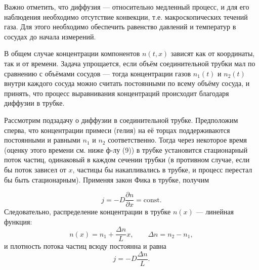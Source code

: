 \documentclass[a4paper]{article}
\begin{document}
	Важно отметить, что диффузия — относительно медленный процесс, и для его наблюдения необходимо отсутствие конвекции, т.е. макроскопических течений газа. Для этого необходимо обеспечить равенство давлений и температур в сосудах до начала измерений.
	
	В общем случае концентрации компонентов $n(t,x)$ зависят как от координаты, так и от времени. Задача упрощается, если объём соединительной трубки мал по сравнению с объёмами сосудов — тогда концентрации газов $n_1(t)$ и $n_2(t)$ внутри каждого сосуда можно считать постоянными по всему объёму сосуда, и принять, что процесс выравнивания концентраций происходит благодаря диффузии в трубке.
	
	Рассмотрим подзадачу о диффузии в соединительной трубке. Предположим сперва, что концентрации примеси (гелия) на её торцах поддерживаются постоянными и равными $n_1$ и $n_2$ соответственно. Тогда через некоторое время (оценку этого времени см. ниже ф-лу (9)) в трубке установится стационарный поток частиц, одинаковый в каждом сечении трубки (в противном случае, если бы поток зависел от $x$, частицы бы накапливались в трубке, и процесс перестал бы быть стационарным). Применяя закон Фика в трубке, получим
	
	\[
	j = -D \frac{\partial n}{\partial x} = \text{const}.
	\]
	Следовательно, распределение концентрации в трубке $n(x)$ — линейная функция:
	\begin{equation} \label{eq:line}
		n(x) = n_1 + \frac{\Delta n}{L} x, \qquad \Delta n = n_2 - n_1, \tag{3}
	\end{equation}
	и плотность потока частиц всюду постоянна и равна
	\begin{equation} \label{eq:flux}
		j = -D \frac{\Delta n}{L}. \tag{4}
	\end{equation}
	
\end{document}
